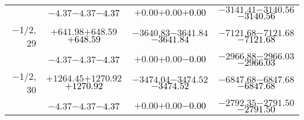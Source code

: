 \documentclass[compress]{beamer}
\begin{document}
\begin{frame}
{\begin{tabular}{r | c | c | c}
           & $-4.37$\hspace{0.1 cm}$-4.37$\hspace{0.1 cm}\textcolor{black}{$-4.37$} & $+0.00$\hspace{0.1 cm}$+0.00$\hspace{0.1 cm}\textcolor{black}{$+0.00$} & $-3141.41$\hspace{0.1 cm}$-3140.56$\hspace{0.1 cm}\textcolor{black}{$-3140.56$} \\
$-$1/2, 29 & $+641.98$\hspace{0.1 cm}$+648.59$\hspace{0.1 cm}\textcolor{black}{$+648.59$} & $-3640.83$\hspace{0.1 cm}$-3641.84$\hspace{0.1 cm}\textcolor{black}{$-3641.84$} & $-7121.68$\hspace{0.1 cm}$-7121.68$\hspace{0.1 cm}\textcolor{black}{$-7121.68$} \\
           & $-4.37$\hspace{0.1 cm}$-4.37$\hspace{0.1 cm}\textcolor{black}{$-4.37$} & $+0.00$\hspace{0.1 cm}$+0.00$\hspace{0.1 cm}\textcolor{black}{$-0.00$} & $-2966.88$\hspace{0.1 cm}$-2966.03$\hspace{0.1 cm}\textcolor{black}{$-2966.03$} \\
$-$1/2, 30 & $+1264.45$\hspace{0.1 cm}$+1270.92$\hspace{0.1 cm}\textcolor{black}{$+1270.92$} & $-3474.04$\hspace{0.1 cm}$-3474.52$\hspace{0.1 cm}\textcolor{black}{$-3474.52$} & $-6847.68$\hspace{0.1 cm}$-6847.68$\hspace{0.1 cm}\textcolor{black}{$-6847.68$} \\
           & $-4.37$\hspace{0.1 cm}$-4.37$\hspace{0.1 cm}\textcolor{black}{$-4.37$} & $+0.00$\hspace{0.1 cm}$+0.00$\hspace{0.1 cm}\textcolor{black}{$-0.00$} & $-2792.35$\hspace{0.1 cm}$-2791.50$\hspace{0.1 cm}\textcolor{black}{$-2791.50$} \\
\end{tabular}}
\end{frame}
\end{document}
